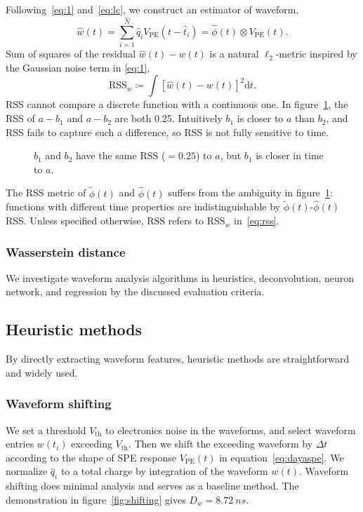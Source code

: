 Following~\eqref{eq:1} and~\eqref{eq:lc}, we construct an estimator of waveform,
\begin{equation}
  \label{eq:w-hat}
  \hat{w}(t) = \sum_{i=1}^{\hat{N}}\hat{q}_i V_\mathrm{PE}(t-\hat{t}_i) = \hat{\phi}(t) \otimes V_\mathrm{PE}(t).
\end{equation}
Sum of squares of the residual $\hat{w}(t) - w(t)$ is a natural $\ell_2$-metric inspired by the Gaussian noise term in \eqref{eq:1},
\begin{equation}
  \label{eq:rss}
  \mathrm{RSS}_w\coloneqq\int\left[\hat{w}(t) - w(t)\right]^2\mathrm{d}t.
\end{equation}
RSS cannot compare a discrete function with a continuous one. In figure~\ref{fig:l2}, the RSS of $a-b_{1}$ and $a-b_{2}$ are both 0.25. Intuitively $b_1$ is closer to $a$ than $b_2$, and RSS fails to capture such a difference, so RSS is not fully sensitive to time. 
\begin{figure}[H]
  \centering
  \resizebox{\textwidth}{!}{}
  \caption{\label{fig:l2} $b_1$ and $b_2$ have the same $\mathrm{RSS}$ ($=0.25$) to $a$, but $b_1$ is closer in time to $a$.}
\end{figure}

The RSS metric of $\tilde{\phi}(t)$ and $\hat{\phi}(t)$ suffers from the ambiguity in figure~\ref{fig:l2}: functions with different time properties are indistinguishable by $\tilde{\phi}(t)$-$\hat{\phi}(t)$ RSS. Unless specified otherwise, $\mathrm{RSS}$ refers to $\mathrm{RSS}_w$ in~\eqref{eq:rss}. 

\subsubsection{Wasserstein distance}
\label{sec:W-dist}



We investigate waveform analysis algorithms in heuristics, deconvolution, neuron network, and regression by the discussed evaluation criteria.

\subsection{Heuristic methods}
By directly extracting waveform features, heuristic methods are straightforward and widely used. 

\subsubsection{Waveform shifting}
\label{sec:shifting}
We set a threshold $V_\mathrm{th}$ to electronics noise in the waveforms, and select waveform entries $w(t_i)$ exceeding $V_\mathrm{th}$. Then we shift the exceeding waveform by $\Delta t$ according to the shape of SPE response $V_\mathrm{PE}(t)$ in equation~\eqref{eq:dayaspe}. We normalize $\hat{q}_i$ to a total charge by integration of the waveform $w(t)$. Waveform shifting does minimal analysis and serves as a baseline method. The demonstration in figure~\ref{fig:shifting} gives $D_w = \SI{8.72}{ns}$.

